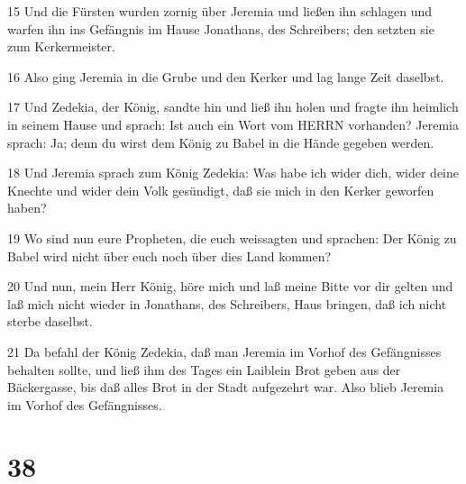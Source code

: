 \par 15 Und die Fürsten wurden zornig über Jeremia und ließen ihn schlagen und warfen ihn ins Gefängnis im Hause Jonathans, des Schreibers; den setzten sie zum Kerkermeister.
\par 16 Also ging Jeremia in die Grube und den Kerker und lag lange Zeit daselbst.
\par 17 Und Zedekia, der König, sandte hin und ließ ihn holen und fragte ihn heimlich in seinem Hause und sprach: Ist auch ein Wort vom HERRN vorhanden? Jeremia sprach: Ja; denn du wirst dem König zu Babel in die Hände gegeben werden.
\par 18 Und Jeremia sprach zum König Zedekia: Was habe ich wider dich, wider deine Knechte und wider dein Volk gesündigt, daß sie mich in den Kerker geworfen haben?
\par 19 Wo sind nun eure Propheten, die euch weissagten und sprachen: Der König zu Babel wird nicht über euch noch über dies Land kommen?
\par 20 Und nun, mein Herr König, höre mich und laß meine Bitte vor dir gelten und laß mich nicht wieder in Jonathans, des Schreibers, Haus bringen, daß ich nicht sterbe daselbst.
\par 21 Da befahl der König Zedekia, daß man Jeremia im Vorhof des Gefängnisses behalten sollte, und ließ ihm des Tages ein Laiblein Brot geben aus der Bäckergasse, bis daß alles Brot in der Stadt aufgezehrt war. Also blieb Jeremia im Vorhof des Gefängnisses.

\chapter{38}

